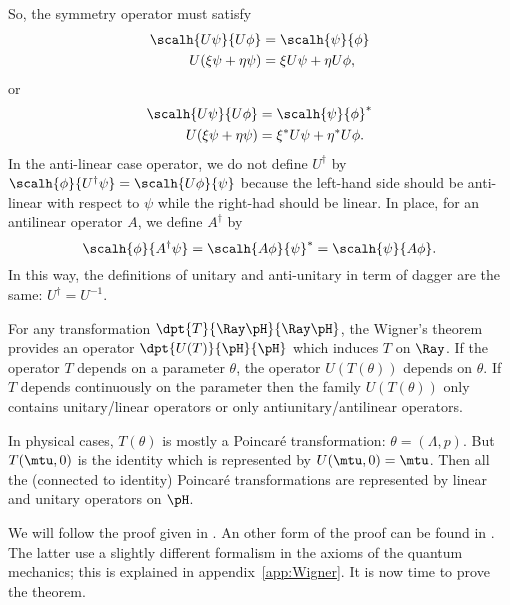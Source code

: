 So, the symmetry operator must satisfy
\begin{subequations}
	\begin{align}
		\scalh{U\psi}{U\phi} & =\scalh{\psi}{\phi}    \\
		U(\xi\psi+\eta\psi)  & =\xi U\psi+\eta U\phi,
	\end{align}
\end{subequations}
or
\begin{subequations}
	\begin{align}
		\scalh{U\psi}{U\phi} & =\scalh{\psi}{\phi}^*      \\
		U(\xi\psi+\eta\psi)  & =\xi^* U\psi+\eta^* U\phi.
	\end{align}
\end{subequations}
In the anti-linear case operator, we do not define $U^{\dag}$ by $\scalh{\phi}{U^{\dag}\psi}=\scalh{U\phi}{\psi}$ because the left-hand side should be anti-linear with respect to $\psi$ while the right-had should be linear. In place, for an antilinear operator $A$, we define $A^{\dag}$ by
\begin{equation}
	\scalh{\phi}{A^{\dag}\psi}=\scalh{A\phi}{\psi}^*=\scalh{\psi}{A\phi}.
\end{equation}
In this way, the definitions of unitary and anti-unitary in term of dagger are the same: $U^{\dag}=U^{-1}$.

For any transformation $\dpt{T}{\Ray \pH}{\Ray \pH}$, the Wigner's theorem provides an operator $\dpt{U(T)}{\pH}{\pH}$ which induces $T$ on $\Ray$. If the operator $T$ depends on a parameter $\theta$, the operator $U(T(\theta))$ depends on $\theta$. If $T$ depends continuously on the parameter then the family $U(T(\theta))$ only contains unitary/linear operators or only antiunitary/antilinear operators.

In physical cases, $T(\theta)$ is mostly a Poincaré transformation: $\theta=(\Lambda,p)$. But $T(\mtu,0)$ is the identity which is represented by $U(\mtu,0)=\mtu$. Then all the (connected to identity) Poincaré transformations are represented by linear and unitary operators on $\pH$.

We will follow the proof given in \cite{Weinberg}. An other form of the proof can be found in \cite{Sternberg}. The latter use a slightly different formalism in the axioms of the quantum mechanics; this is explained in appendix~\ref{app:Wigner}. It is now time to prove the theorem.


